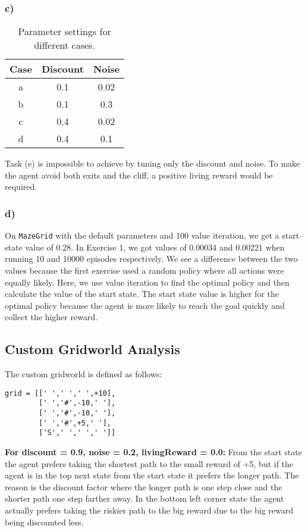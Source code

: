 \documentclass[11pt]{article}
\begin{document}
\subsubsection*{c)}

\begin{table}[H]
\centering
\begin{tabular}{|c|c|c|}
\hline
\textbf{Case} & \textbf{Discount} & \textbf{Noise} \\ \hline
a & 0.1 & 0.02 \\ \hline
b & 0.1 & 0.3 \\ \hline
c & 0.4 & 0.02 \\ \hline
d & 0.4 & 0.1 \\ \hline
\end{tabular}
\caption{Parameter settings for different cases.}
\end{table}

\noindent
Task (e) is impossible to achieve by tuning only the discount
and noise. To make the agent avoid both exits and the cliff, a positive living
reward would be required.

\subsubsection*{d)} On \texttt{MazeGrid} with the default parameters and 100 value iteration, we get a start--state value of 0.28. In Exercise 1, we got values of 0.00034 and 0.00221 when running 10 and 10000 episodes respectively. We see a difference between the two values because the first exercise used a random policy where all actions were equally likely. Here, we use value iteration to find the optimal policy and then calculate the value of the start state. The start state value is higher for the optimal policy because the agent is more likely to reach the goal quickly and collect the higher reward.

\subsection{Custom Gridworld Analysis}
The custom gridworld is defined as follows:

\begin{verbatim}
grid = [[' ',' ',' ',+10],
        [' ','#',-10,' '],
        [' ','#',-10,' '],
        [' ','#',+5,' '],
        ['S',' ',' ',' ']]
\end{verbatim}

\noindent \textbf{For discount = 0.9, noise = 0.2, livingReward = 0.0:} From the start state the agent prefers taking the shortest path to the small reward of +5, but if the agent is in the top next state from the start state it prefers the longer path. The reason is the discount factor where the longer path is one step close and the shorter path one step farther away. In the bottom left corner state the agent actually prefers taking the riskier path to the big reward due to the big reward being discounted
less.
\end{document}
